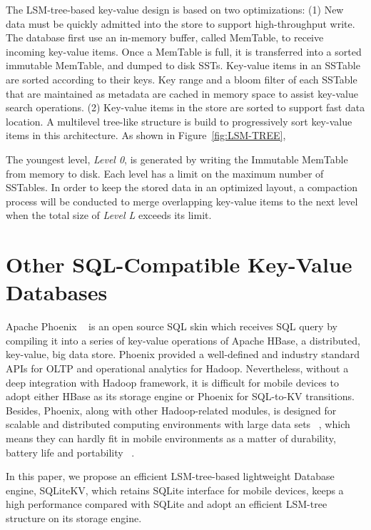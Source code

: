 The LSM-tree-based key-value design is based on two optimizations: (1) New data must be quickly admitted into the store to support high-throughput write. The database first use an in-memory buffer, called MemTable, to receive incoming key-value items. Once a MemTable is full, it is transferred into a sorted immutable MemTable, and dumped to disk SSTs. Key-value items in an SSTable are sorted according to their keys. Key range and a bloom filter of each SSTable that are maintained as metadata are cached in memory space to assist key-value search operations. (2) Key-value items in the store are sorted to support fast data location. A multilevel tree-like structure is build to progressively sort key-value items in this architecture. As shown in Figure~\ref{fig:LSM-TREE}, %

The youngest level, \emph{Level 0}, is generated by writing the Immutable MemTable from memory to disk. Each level has a limit on the maximum number of SSTables. In order to keep the stored data in an optimized layout, a compaction process will be conducted to merge overlapping key-value items to the next level when the total size of \emph{Level L} exceeds its limit. 



\section{Other SQL-Compatible Key-Value Databases}
Apache Phoenix ~\cite{ApachePhoenix} is an open source SQL skin %
which receives SQL query by compiling it into a series of key-value operations of Apache HBase, a distributed, key-value, big data store. Phoenix provided a well-defined and industry standard APIs for OLTP and operational analytics for Hadoop. Nevertheless, without a deep integration with Hadoop framework, it is difficult for mobile devices to adopt either HBase as its storage engine or Phoenix for SQL-to-KV transitions. Besides, Phoenix, along with other Hadoop-related modules, is designed for scalable and distributed computing environments with large data sets ~\cite{forman1994challenges}, which means they can hardly fit in mobile environments as a matter of durability, battery life and portability ~\cite{sinha2016low}.

In this paper, we propose an efficient LSM-tree-based lightweight Database engine, SQLiteKV, which retains SQLite interface for mobile devices, keeps a high performance compared with SQLite and adopt an efficient LSM-tree structure on its storage engine.
